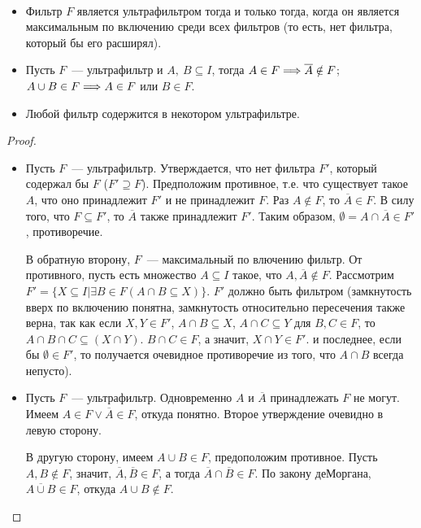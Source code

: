 \begin{stat} \ 
    \begin{itemize}
        \item Фильтр $F$ является ультрафильтром тогда и только тогда, когда он является максимальным по включению среди всех фильтров (то есть, нет фильтра, который бы его расширял). 
        \item Пусть $F$~— ультрафильтр и $A, \: B \subseteq I$, тогда $A \in F \Longrightarrow \overline{A} \notin F$; $A \cup B \in F \Longrightarrow A \in F$ или $B \in F$.
        \item Любой фильтр содержится в некотором ультрафильтре.
    \end{itemize}
\end{stat}

\begin{proof} \ 
    \begin{itemize}
        \item Пусть $F$~— ультрафильтр. Утверждается, что нет фильтра $F'$, который содержал бы $F$ ($F' \supseteq F$). Предположим противное, т.е. что существует такое $A$, что оно принадлежит $F'$ и не принадлежит $F$. Раз $A \notin F$, то $\overline{A} \in F$. В силу того, что $F \subseteq F'$, то $\overline{A}$ также принадлежит $F'$. Таким образом, $\emptyset = A \cap \overline{A} \in F'$, противоречие. 
        
        В обратную второну, $F$~— максимальный по влючению фильтр. От противного, пусть есть множество $A \subseteq I$ такое, что $A, \overline{A} \notin F$. Рассмотрим $F' = \{X \subseteq I | \exists B \in F (A \cap B \subseteq X)\}$. $F'$ должно быть фильтром (замкнутость вверх по включению понятна, замкнутость относительно пересечения также верна, так как если $X, Y \in F'$, $A \cap B \subseteq X$, $A \cap C \subseteq Y$ для $B, C \in F$, то $A \cap B \cap C \subseteq (X \cap Y)$. $B \cap C \in F$, а значит, $X \cap Y \in F'$. и последнее, если бы $\emptyset \in F'$, то получается очевидное противоречие из того, что $A \cap B$ всегда непусто). 
        
        \item Пусть $F$~— ультрафильтр. Одновременно $A$ и $\overline{A}$ принадлежать $F$ не могут. Имеем $A \in F \vee \overline{A} \in F$, откуда понятно. Второе утверждение очевидно в левую сторону.
        
        В другую сторону, имеем $A \cup B \in F$, предоположим противное. Пусть $A, B \notin F$, значит, $\overline{A}, \overline{B} \in F$, а тогда $\overline{A} \cap \overline{B} \in F$. По закону деМоргана, $\overline{A \cup B} \in F$, откуда $A \cup B \notin F$. 


\end{itemize}
\end{proof}
